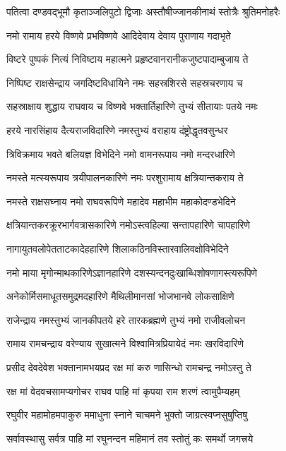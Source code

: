 \twolineshloka
{पतित्वा दण्डवद्भूमौ कृताञ्जलिपुटो द्विजाः}
{अस्तौषीज्जानकीनाथं स्तोत्रैः श्रुतिमनोहरैः}%


\twolineshloka
{नमो रामाय हरये विष्णवे प्रभविष्णवे}
{आदिदेवाय देवाय पुराणाय गदाभृते}%

\twolineshloka
{विष्टरे पुष्पकं नित्यं निविष्टाय महात्मने}
{प्रहृष्टवानरानीकजुष्टपादाम्बुजाय ते}%

\twolineshloka
{निष्पिष्ट राक्षसेन्द्राय जगदिष्टविधायिने}
{नमः सहस्रशिरसे सहस्रचरणाय च}%

\twolineshloka
{सहस्राक्षाय शुद्धाय राघवाय च विष्णवे}
{भक्तार्तिहारिणे तुभ्यं सीतायाः पतये नमः}%

\twolineshloka
{हरये नारसिंहाय दैत्यराजविदारिणे}
{नमस्तुभ्यं वराहाय दंष्ट्रोद्धृतवसुन्धर}%

\twolineshloka
{त्रिविक्रमाय भवते बलियज्ञ विभेदिने}
{नमो वामनरूपाय नमो मन्दरधारिणे}%

\twolineshloka
{नमस्ते मत्स्यरूपाय त्रयीपालनकारिणे}
{नमः परशुरामाय क्षत्रियान्तकराय ते}%

\twolineshloka
{नमस्ते राक्षसघ्नाय नमो राघवरूपिणे}
{महादेव महाभीम महाकोदण्डभेदिने}%

\twolineshloka
{क्षत्रियान्तकरक्रूरभार्गवत्रासकारिणे}
{नमोऽस्त्वहिल्या सन्तापहारिणे चापहारिणे}%

\twolineshloka
{नागायुतवलोपेतताटकादेहहारिणे}
{शिलाकठिनविस्तारवालिवक्षोविभेदिने}%

\twolineshloka
{नमो माया मृगोन्माथकारिणेऽज्ञानहारिणे}
{दशस्यन्दनदुःखाब्धिशोषणागस्त्यरूपिणे}%

\twolineshloka
{अनेकोर्मिसमाधूतसमुद्रमदहारिणे}
{मैथिलीमानसां भोजभानवे लोकसाक्षिणे}%

\twolineshloka
{राजेन्द्राय नमस्तुभ्यं जानकीपतये हरे}
{तारकब्रह्मणे तुभ्यं नमो राजीवलोचन}%

\twolineshloka
{रामाय रामचन्द्राय वरेण्याय सुखात्मने}
{विश्वामित्रप्रियायेदं नमः खरविदारिणे}%

\twolineshloka
{प्रसीद देवदेवेश भक्तानामभयप्रद}
{रक्ष मां करु णासिन्धो रामचन्द्र नमोऽस्तु ते}%

\twolineshloka
{रक्ष मां वेदवचसामप्यगोचर राघव}
{पाहि मां कृपया राम शरणं त्वामुपैम्यहम्}%

\twolineshloka
{रघुवीर महामोहमपाकुरु ममाधुना}
{स्नाने चाचमने भुक्तो जाग्रत्स्वप्नसुषुप्तिषु}%

\twolineshloka
{सर्वावस्थासु सर्वत्र पाहि मां रघुनन्दन}
{महिमानं तव स्तोतुं कः समर्थो जगत्त्रये}%

